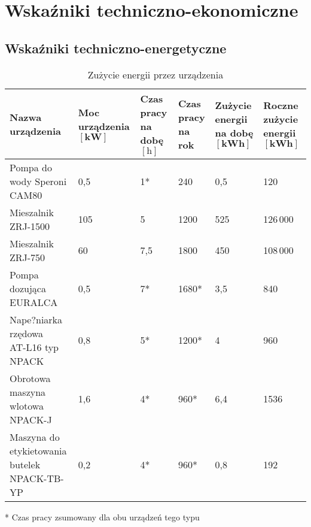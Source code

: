 \section{Wskaźniki techniczno-ekonomiczne}

\subsection{Wskaźniki techniczno-energetyczne}

\begin{table}[h]
	\centering
	\caption{Zużycie energii przez urządzenia}
	\begin{tabular}{*{6}{l}}
		\hline
		\makecell[l]{\textbf{Nazwa} \\ \textbf{urządzenia}} & \makecell[l]{\textbf{Moc urządzenia} \\ $[\mathrm{\mathbf{kW}}]$} & \makecell[l]{\textbf{Czas pracy} \\ \textbf{na dobę} $[\mathbf{\mathrm{h}}]$} & \makecell[l]{\textbf{Czas pracy} \\ \textbf{na rok}} & \makecell[l]{\textbf{Zużycie energii} \\ \textbf{na dobę} $[\mathrm{\mathbf{kWh}}]$} & \makecell[l]{\textbf{Roczne zużycie} \\ \textbf{energii} $[\mathrm{\mathbf{kWh}}]$} \\
		\hline\hline
		Pompa do wody \textsf{Speroni CAM80} & 0,5 & 1* & 240 & 0,5 & 120 \\
		Mieszalnik \textsf{ZRJ-1500} & 105 & 5 & 1200 & 525 & 126\,000 \\
		Mieszalnik \textsf{ZRJ-750} & 60 & 7,5 & 1800 & 450 & 108\,000 \\
		Pompa dozująca \textsf{EURALCA} & 0,5 & 7* & 1680* & 3,5 & 840 \\
		\makecell[l]{Nape?niarka rzędowa \\ \textsf{AT-L16 typ NPACK}} & 0,8 & 5* & 1200* & 4 & 960 \\
		\makecell[l]{Obrotowa maszyna wlotowa \\ \textsf{NPACK-J}} & 1,6 & 4* & 960* & 6,4 & 1536 \\
		\makecell[l]{Maszyna do \\ etykietowania butelek \textsf{NPACK-TB-YP}} & 0,2 & 4* & 960* & 0,8 & 192 \\
		\hline
	\end{tabular}
\end{table}

* Czas pracy zsumowany dla obu urządzeń tego typu

